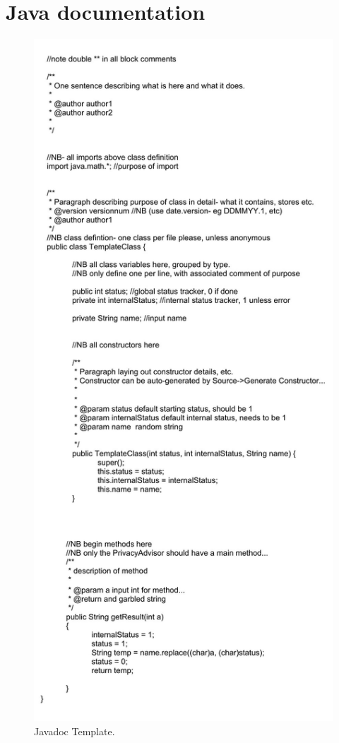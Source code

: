 \section{Java documentation}
\begin{figure}[hthp]
\begin{center}
\includegraphics[height = \textheight/3*2]{Appendix/javadocTemp.jpg}
\caption{Javadoc Template.}
\label{JavadocTemplate}
\end{center}
\end{figure}
